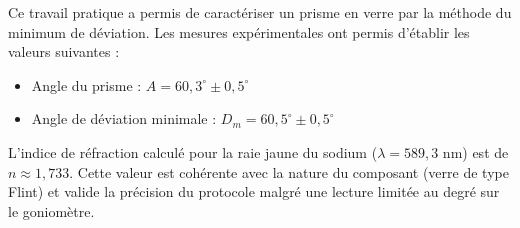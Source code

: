 Ce travail pratique a permis de caractériser un prisme en verre par la méthode du minimum de déviation. Les mesures expérimentales ont permis d'établir les valeurs suivantes :
\begin{itemize}
    \item Angle du prisme : $A = 60,3^\circ \pm 0,5^\circ$
    \item Angle de déviation minimale : $D_m = 60,5^\circ \pm 0,5^\circ$
\end{itemize}

L'indice de réfraction calculé pour la raie jaune du sodium ($\lambda = 589,3$ nm) est de $n \approx 1,733$. Cette valeur est cohérente avec la nature du composant (verre de type Flint) 
et valide la précision du protocole malgré une lecture limitée au degré sur le goniomètre. 